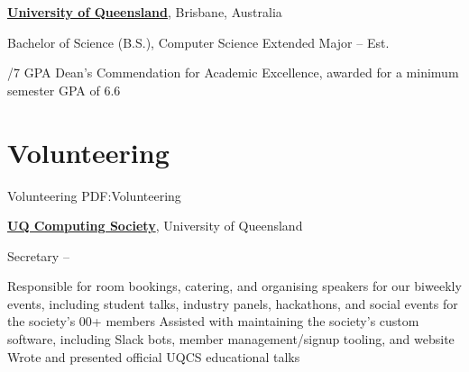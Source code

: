 \documentclass[a4paper,10pt,oneside]{article}
\begin{document}
\begin{body}
\href{https://www.uq.edu.au/}{\textbf{University of Queensland}}, Brisbane, Australia
\par Bachelor of Science (B.S.), Computer Science Extended Major\hfill {} -- Est. 
\begin{detail}
/7 GPA
\BulletItem Dean's Commendation for Academic Excellence, awarded for a minimum semester GPA of 6.6 \hfill {}
\end{detail}




\section
{Volunteering}
{Volunteering}
{PDF:Volunteering}

\href{https://uqcs.org.au/}
{\textbf{UQ Computing Society}}, University of Queensland

\par Secretary\hfill {} -- 

\begin{detail}
\BulletItem Responsible for room bookings, catering, and organising speakers for our biweekly events, including student talks, industry panels, hackathons, and social events for the society's 00+ members
\BulletItem Assisted with maintaining the society's custom software, including Slack bots, member management/signup tooling, and website
\BulletItem Wrote and presented official UQCS educational talks
\end{detail}


\end{body}
\end{document}
